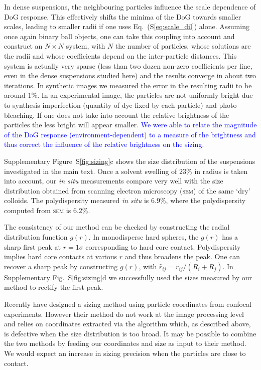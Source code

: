 \documentclass[prl,twocolumn,notitlepage]{revtex4-1}
\begin{document}
In dense suspensions, the neighbouring particles influence the scale dependence of DoG response. This effectively shifts the minima of the DoG towards smaller scales, leading to smaller radii if one uses Eq.~(S\ref{eq:scale_dil}) alone. Assuming once again binary ball objects, one can take this coupling into account and construct an $N\times N$ system, with $N$ the number of particles, whose solutions are the radii and whose coefficients depend on the inter-particle distances. This system is actually very sparse (less than two dozen non-zero coefficients per line, even in the dense suspensions studied here) and the results converge in about two iterations. In synthetic images we measured the error in the resulting radii to be around $1\%$. In an experimental image, the particles are not uniformly bright due to synthesis imperfection (quantity of dye fixed by each particle) and photo bleaching. If one does not take into account the relative brightness of the particles the less bright will appear smaller. \textcolor{blue}{We were able to relate the magnitude of the DoG response (environment-dependent) to a measure of the brightness and thus correct the influence of the relative brightness on the sizing.}

Supplementary Figure~S\ref{fig:sizing}c shows the size distribution of the suspensions investigated in the main text. Once a solvent swelling of $23\%$ in radius is taken into account, our \emph{in situ} measurements compare very well with the size distribution obtained from scanning electron microscopy (\textsc{sem}) of the same `dry' colloids. The polydispersity measured \emph{in situ} is $6.9\%$, where the polydispersity computed from \textsc{sem} is $6.2\%$.

The consistency of our method can be checked by constructing the radial distribution function $g(r)$. In monodisperse hard spheres, the $g(r)$ has a sharp first peak at $r=1\sigma$ corresponding to hard core contact. Polydispersity implies hard core contacts at various $r$ and thus broadens the peak. One can recover a sharp peak by constructing $g(\hat{r})$, with $\hat{r}_{ij} = r_{ij}/(R_i+R_j)$. In Supplementary Fig.~S\ref{fig:sizing}d we successfully used the sizes measured by our method to rectify the first peak.

Recently \citet{Kurita2011,Kurita2011b} have designed a sizing method using particle coordinates from confocal experiments. However their method do not work at the image processing level and relies on coordinates extracted via the \citet{Crocker1996} algorithm which, as described above, is defective when the size distribution is too broad. It may be possible to combine the two methods by feeding our coordinates and size as input to their method. We would expect an increase in sizing precision when the particles are close to contact.
\end{document}
